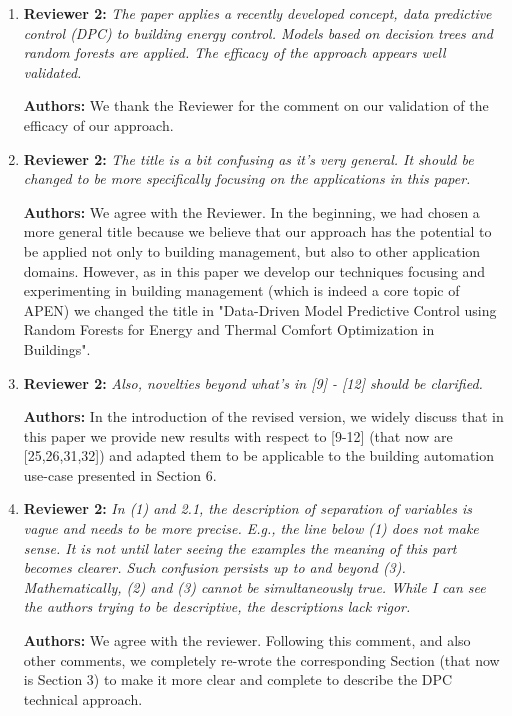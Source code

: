 \documentclass{article}
\begin{document}
\begin{enumerate}

\item \textbf{Reviewer 2:} \textit{The paper applies a recently developed concept, data predictive control (DPC) to building energy control. Models based on decision trees and random forests are applied. The efficacy of the approach appears well validated.}

\textbf{Authors:} We thank the Reviewer for the comment on our validation of the efficacy of our approach.

\item \textbf{Reviewer 2:} \textit{The title is a bit confusing as it's very general. It should be changed to be more specifically focusing on the applications in this paper.}

\textbf{Authors:} We agree with the Reviewer. In the beginning, we had chosen a more general title because we believe that our approach has the potential to be applied not only to building management, but also to other application domains. However, as in this paper we develop our techniques focusing and experimenting in building management (which is indeed a core topic of APEN) we changed the title in "Data-Driven Model Predictive Control using Random Forests for Energy and Thermal Comfort Optimization in Buildings". 

\item \textbf{Reviewer 2:} \textit{Also, novelties beyond what's in [9] - [12] should be clarified.}

\textbf{Authors:} In the introduction of the revised version, we widely discuss that in this paper we provide new results with respect to [9-12] (that now are [25,26,31,32]) and adapted them to be applicable to the building automation use-case presented in Section 6.

\item \textbf{Reviewer 2:} \textit{In (1) and 2.1, the description of separation of variables is vague and needs to be more precise. E.g., the line below (1) does not make sense. It is not until later seeing the examples the meaning of this part becomes clearer. Such confusion persists up to and beyond (3). Mathematically, (2) and (3) cannot be simultaneously true. While I can see the authors trying to be descriptive, the descriptions lack rigor.} 

\textbf{Authors:}  We agree with the reviewer. Following this comment, and also other comments, we completely re-wrote the corresponding Section (that now is Section 3) to make it more clear and complete to describe the DPC technical approach.



\end{enumerate}
\end{document}
